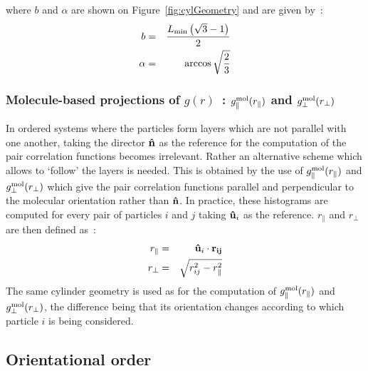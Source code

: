 where $b$ and $\alpha$ are shown on Figure~\ref{fig:cylGeometry} and are given by~:
\begin{eqnarray*}
	b &=& \frac{L_{\mathrm{min}} \left( \sqrt{3}-1 \right)}{2}	\\
	\alpha &=& \arccos\sqrt{\frac{2}{3}}
\end{eqnarray*}


\subsubsection{Molecule-based projections of $g(r)$~: 
$g^{\mathrm{mol}}_\parallel(r_\parallel)$ and $g^{\mathrm{mol}}_\perp(r_\perp)$}

In ordered systems where the particles form layers which are not parallel with one another, taking
the director $\mathbf{\hat{n} }$ as the reference for the computation of the pair correlation functions
becomes irrelevant. Rather an alternative scheme which allows to `follow' the layers is needed.
This is obtained by the use of $g^{\mathrm{mol}}_\parallel(r_\parallel)$ and
$g^{\mathrm{mol}}_\perp(r_\perp)$ which give the pair correlation functions parallel and
perpendicular to the molecular orientation rather than $\mathbf{\hat{n} }$. In practice, these histograms 
are computed for every pair of particles $i$ and $j$ taking $\mathbf{\hat{u} }_i$ as the reference. 
$r_\parallel$ and $r_\perp$ are then defined as~:
%
\begin{eqnarray}
	r_\parallel &=& \mathbf{\hat{u} }_i \cdot \mathbf{r_{ij}}	\\
	r_\perp &=& \sqrt{r_{ij}^2 - r_\parallel^2 }
\end{eqnarray}
%
The same cylinder geometry is used as for the computation of $g^{\mathrm{mol}}_\parallel(r_\parallel)$ and
$g^{\mathrm{mol}}_\perp(r_\perp)$, the difference being that its orientation changes according to which
particle $i$ is being considered.





\subsection{Orientational order}
\label{ss:P2}

